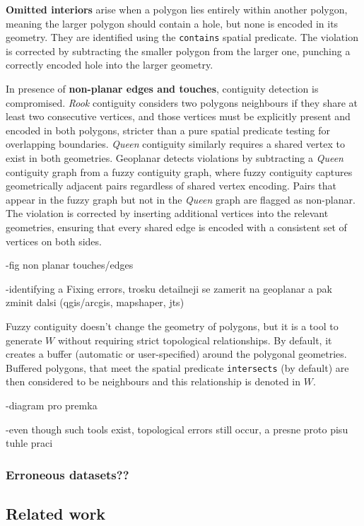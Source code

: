 \documentclass[
  english,
  12pt,
  a4paper,
]{article}
\begin{document}
\textbf{Omitted interiors} arise when a polygon lies entirely within
another polygon, meaning the larger polygon should contain a hole, but
none is encoded in its geometry. They are identified using the
\texttt{contains} spatial predicate. The violation is corrected by
subtracting the smaller polygon from the larger one, punching a
correctly encoded hole into the larger geometry.

In presence of \textbf{non-planar edges and touches}, contiguity
detection is compromised. \emph{Rook} contiguity considers two polygons
neighbours if they share at least two consecutive vertices, and those
vertices must be explicitly present and encoded in both polygons,
stricter than a pure spatial predicate testing for overlapping
boundaries. \emph{Queen} contiguity similarly requires a shared vertex
to exist in both geometries. Geoplanar detects violations by subtracting
a \emph{Queen} contiguity graph from a fuzzy contiguity graph, where
fuzzy contiguity captures geometrically adjacent pairs regardless of
shared vertex encoding. Pairs that appear in the fuzzy graph but not in
the \emph{Queen} graph are flagged as non-planar. The violation is
corrected by inserting additional vertices into the relevant geometries,
ensuring that every shared edge is encoded with a consistent set of
vertices on both sides.

-fig non planar touches/edges

-identifying a Fixing errors, trosku detailneji se zamerit na geoplanar
a pak zminit dalsi (qgis/arcgis, mapshaper, jts)

Fuzzy contiguity \citep{rey2022PySAL} doesn't change the geometry of
polygons, but it is a tool to generate \(W\) without requiring strict
topological relationships. By default, it creates a buffer (automatic or
user-specified) around the polygonal geometries. Buffered polygons, that
meet the spatial predicate \texttt{intersects} (by default) are then
considered to be neighbours and this relationship is denoted in \(W\).

-diagram pro premka

-even though such tools exist, topological errors still occur, a presne
proto pisu tuhle praci

\subsubsection{Erroneous datasets??}\label{erroneous-datasets}

\subsection{Related work}\label{related-work}
\end{document}
